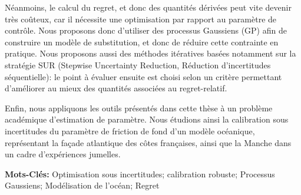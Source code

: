 \documentclass[12pt, a4paper]{article}
\begin{document}
Néanmoins, le calcul du regret, et donc des quantités dérivées peut
vite devenir très coûteux, car il nécessite une optimisation par
rapport au paramètre de contrôle. Nous proposons donc d'utiliser des
processus Gaussiens (GP) afin de construire un modèle de substitution,
et donc de réduire cette contrainte en pratique. Nous proposons aussi
des méthodes itératives basées notamment sur la stratégie SUR
(Stepwise Uncertainty Reduction, Réduction d'incertitudes
séquentielle): le point à évaluer ensuite est choisi selon un critère
permettant d'améliorer au mieux des quantités associées au
regret-relatif.

Enfin, nous appliquons les outils présentés dans cette thèse à un
problème académique d'estimation de paramètre. Nous étudions ainsi
la calibration sous incertitudes du paramètre de friction de fond d'un
modèle océanique, représentant la façade atlantique des côtes
françaises, ainsi que la Manche dans un cadre d'expériences jumelles.

\vspace{0.5cm}
\textbf{Mots-Clés:} Optimisation sous incertitudes; calibration
robuste; Processus Gaussiens; Modélisation de l'océan; Regret
\vfill
\end{document}
